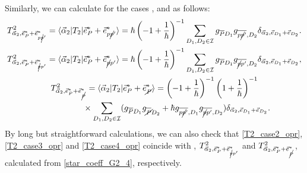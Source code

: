 \documentclass[10pt,a4paper]{amsart}
\numberwithin{equation}{section}
\begin{document}
Similarly, we can calculate for the cases
,
and
as follows:
\begin{gather}
T^{2}_{\vec{\alpha}_{2},
\vec{e}_{P}^{\ast}
+
\vec{e}_{p\cancel{p}'}^{\ast}
}
=
\langle
\vec{\alpha}_{2}
|
T_{2}
|
\vec{e}_{P}^{\ast}
+
\vec{e}_{p\cancel{p}'}^{\ast}
\rangle
=
\hbar
 \left(
-1
+
\frac{1}{\hbar}
 \right)^{-1}
\sum_{
D_{1},D_{2}
\in
\mathcal{I}
}
g_{\overline{P}D_{1}}
g_{\overline{p\cancel{p}'},D_{2}}
\delta_{
\vec{\alpha}_{2},
\vec{e}_{D_{1}}
+
\vec{e}_{D_{2}}
}.
\label{T2_case2_opr}
\\
T^{2}_{\vec{\alpha}_{2},
\vec{e}_{P}^{\ast}
+
\vec{e}_{\cancel{p}p'}^{\ast}
}
=
\langle
\vec{\alpha}_{2}
|
T_{2}
|
\vec{e}_{P}^{\ast}
+
\vec{e}_{\cancel{p}p'}^{\ast}
\rangle
=
\hbar
 \left(
-1
+
\frac{1}{\hbar}
 \right)^{-1}
\sum_{
D_{1},D_{2}
\in
\mathcal{I}
}
g_{\overline{P}D_{1}}
g_{\overline{\cancel{p}p'},D_{2}}
\delta_{
\vec{\alpha}_{2},
\vec{e}_{D_{1}}
+
\vec{e}_{D_{2}}
},
\label{T2_case3_opr}
\\
T^{2}_{\vec{\alpha}_{2},
\vec{e}_{P}^{\ast}
+
\vec{e}_{\cancel{P}}^{\ast}
}
=
\langle
\vec{\alpha}_{2}
|
T_{2}
|
\vec{e}_{P}^{\ast}
+
\vec{e}_{\cancel{P}}^{\ast}
\rangle=
 \left(
-1
+
\frac{1}{\hbar}
 \right)^{-1}
 \left(
1
+
\frac{1}{\hbar}
 \right)^{-1}
\nonumber
\\
\phantom{T^{2}_{\vec{\alpha}_{2},
\vec{e}_{P}^{\ast}
+
\vec{e}_{\cancel{P}}^{\ast}
}
=}{}
\times
\sum_{
D_{1},D_{2}
\in
\mathcal{I}
}
 (
g_{\overline{P}D_{1}}
g_{\overline{\cancel{P}}D_{2}}
+
\hbar
g_{\overline{p\cancel{p}'},D_{1}}
g_{\overline{\cancel{p}p'},D_{2}}
 )
\delta_{
\vec{\alpha}_{2},
\vec{e}_{D_{1}}
+
\vec{e}_{D_{2}}
}
.
\label{T2_case4_opr}
\end{gather}
By long but straightforward calculations, we can also check that \eqref{T2_case2_opr}, \eqref{T2_case3_opr} and \eqref{T2_case4_opr} coincide with
,
$
T^{2}_{\vec{\alpha}_{2},
\vec{e}_{P}^{\ast}
+
\vec{e}_{\cancel{p}p'}^{\ast}
}
$
and
$
T^{2}_{\vec{\alpha}_{2},
\vec{e}_{P}^{\ast}
+
\vec{e}_{\cancel{P}}^{\ast}
}
$,
calculated from \eqref{star_coeff_G2_4}, respectively.
\end{document}
